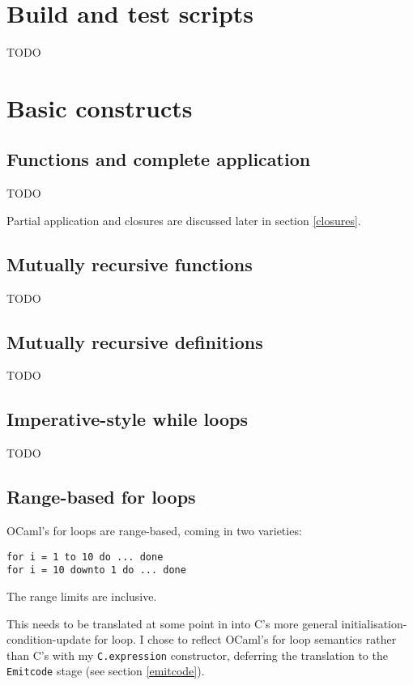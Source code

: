 \documentclass[12pt,a4paper,twoside,openright]{report}
\begin{document}
\section{Build and test scripts}

TODO


\section{Basic constructs}

\subsection{Functions and complete application}\label{functions}

TODO

Partial application and closures are discussed later in section \ref{closures}.

\subsection{Mutually recursive functions}\label{mutually-recursive-functions}

TODO

\subsection{Mutually recursive definitions}\label{mutually-recursive-values}

TODO

\subsection{Imperative-style while loops}\label{while-loops}

TODO

\subsection{Range-based for loops}\label{for-loops}

OCaml's for loops are range-based, coming in two varieties:
\begin{lstlisting}
for i = 1 to 10 do ... done
for i = 10 downto 1 do ... done
\end{lstlisting}

The range limits are inclusive.

This needs to be translated at some point in into C's more general
initialisation-condition-update for loop. I chose to reflect OCaml's for loop
semantics rather than C's with my \lstinline!C.expression!
constructor, deferring the translation to the \lstinline!Emitcode! stage (see
section \ref{emitcode}).
\end{document}
